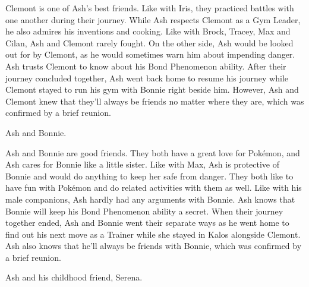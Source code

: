 \documentclass[a4paper,12pt]{article}
\begin{document}
Clemont is one of Ash's best friends. Like with Iris, they practiced battles with one another during their journey. While Ash respects Clemont as a Gym Leader, he also admires his inventions and cooking. Like with Brock, Tracey, Max and Cilan, Ash and Clemont rarely fought. On the other side, Ash would be looked out for by Clemont, as he would sometimes warn him about impending danger. Ash trusts Clemont to know about his Bond Phenomenon ability. After their journey concluded together, Ash went back home to resume his journey while Clemont stayed to run his gym with Bonnie right beside him. However, Ash and Clemont knew that they'll always be friends no matter where they are, which was confirmed by a brief reunion.\\ \par \vspace{0.5cm}

Ash and Bonnie.\\ \par \vspace{0.5cm}

Ash and Bonnie are good friends. They both have a great love for Pokémon, and Ash cares for Bonnie like a little sister. Like with Max, Ash is protective of Bonnie and would do anything to keep her safe from danger. They both like to have fun with Pokémon and do related activities with them as well. Like with his male companions, Ash hardly had any arguments with Bonnie. Ash knows that Bonnie will keep his Bond Phenomenon ability a secret. When their journey together ended, Ash and Bonnie went their separate ways as he went home to find out his next move as a Trainer while she stayed in Kalos alongside Clemont. Ash also knows that he'll always be friends with Bonnie, which was confirmed by a brief reunion.\\ \par \vspace{0.5cm}

Ash and his childhood friend, Serena.\\ \par \vspace{0.5cm}
\end{document}
